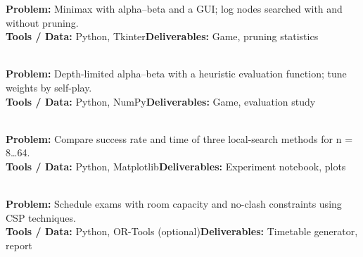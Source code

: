 \documentclass[11pt]{article}
\begin{document}
\begin{tcolorbox}[enhanced,breakable,colback=white,colframe=teal,arc=2mm,boxrule=0.9pt,
  title={\textbf{PII.04\quad Unbeatable Tic-Tac-Toe}\hfill \colorbox{white}{\textcolor{teal}{\scriptsize\bfseries MINI}}},fonttitle=\color{white},colbacktitle=teal]
\textbf{\color{navy}Problem:} Minimax with alpha--beta and a GUI; log nodes searched with and without pruning.\\[2pt]
\textbf{\color{navy}Tools / Data:} Python, Tkinter\qquad \textbf{\color{navy}Deliverables:} Game, pruning statistics\\[2pt]
\ 
\end{tcolorbox}
\begin{tcolorbox}[enhanced,breakable,colback=white,colframe=crimson,arc=2mm,boxrule=0.9pt,
  title={\textbf{PII.05\quad Connect-Four AI}\hfill \colorbox{white}{\textcolor{crimson}{\scriptsize\bfseries MAJOR}}},fonttitle=\color{white},colbacktitle=crimson]
\textbf{\color{navy}Problem:} Depth-limited alpha--beta with a heuristic evaluation function; tune weights by self-play.\\[2pt]
\textbf{\color{navy}Tools / Data:} Python, NumPy\qquad \textbf{\color{navy}Deliverables:} Game, evaluation study\\[2pt]
\ 
\end{tcolorbox}
\begin{tcolorbox}[enhanced,breakable,colback=white,colframe=teal,arc=2mm,boxrule=0.9pt,
  title={\textbf{PII.06\quad N-Queens: Hill Climbing vs SA vs GA}\hfill \colorbox{white}{\textcolor{teal}{\scriptsize\bfseries MINI}}},fonttitle=\color{white},colbacktitle=teal]
\textbf{\color{navy}Problem:} Compare success rate and time of three local-search methods for n = 8\dots{}64.\\[2pt]
\textbf{\color{navy}Tools / Data:} Python, Matplotlib\qquad \textbf{\color{navy}Deliverables:} Experiment notebook, plots\\[2pt]
\ 
\end{tcolorbox}
\begin{tcolorbox}[enhanced,breakable,colback=white,colframe=crimson,arc=2mm,boxrule=0.9pt,
  title={\textbf{PII.07\quad Exam Timetable CSP}\hfill \colorbox{white}{\textcolor{crimson}{\scriptsize\bfseries MAJOR}}},fonttitle=\color{white},colbacktitle=crimson]
\textbf{\color{navy}Problem:} Schedule exams with room capacity and no-clash constraints using CSP techniques.\\[2pt]
\textbf{\color{navy}Tools / Data:} Python, OR-Tools (optional)\qquad \textbf{\color{navy}Deliverables:} Timetable generator, report\\[2pt]
\ 
\end{tcolorbox}
\end{document}
